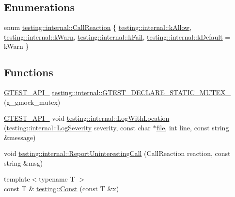 \subsection*{Enumerations}
\begin{DoxyCompactItemize}
\item 
enum \hyperlink{namespacetesting_1_1internal_adfcd859062983a889f4bd18e6977357e}{testing\+::internal\+::\+Call\+Reaction} \{ \hyperlink{namespacetesting_1_1internal_adfcd859062983a889f4bd18e6977357ea8fb8a836a31364701cd5c07daa8638cb}{testing\+::internal\+::k\+Allow}, 
\hyperlink{namespacetesting_1_1internal_adfcd859062983a889f4bd18e6977357ead61a9c681c751967e19f7abe4640d4a2}{testing\+::internal\+::k\+Warn}, 
\hyperlink{namespacetesting_1_1internal_adfcd859062983a889f4bd18e6977357ea6fc25174a501f31b090a2b556f77fdc1}{testing\+::internal\+::k\+Fail}, 
\hyperlink{namespacetesting_1_1internal_adfcd859062983a889f4bd18e6977357ea8ff660434ddb710d1d588df98ee902fc}{testing\+::internal\+::k\+Default} = k\+Warn
 \}
\end{DoxyCompactItemize}
\subsection*{Functions}
\begin{DoxyCompactItemize}
\item 
\hyperlink{gtest-port_8h_aa73be6f0ba4a7456180a94904ce17790}{G\+T\+E\+S\+T\+\_\+\+A\+P\+I\+\_\+} \hyperlink{namespacetesting_1_1internal_ae4d273e9b76b40a28483826518e68f17}{testing\+::internal\+::\+G\+T\+E\+S\+T\+\_\+\+D\+E\+C\+L\+A\+R\+E\+\_\+\+S\+T\+A\+T\+I\+C\+\_\+\+M\+U\+T\+E\+X\+\_\+} (g\+\_\+gmock\+\_\+mutex)
\item 
\hyperlink{gtest-port_8h_aa73be6f0ba4a7456180a94904ce17790}{G\+T\+E\+S\+T\+\_\+\+A\+P\+I\+\_\+} void \hyperlink{namespacetesting_1_1internal_af271cd1fc0b62a7f4736cb3109e86a37}{testing\+::internal\+::\+Log\+With\+Location} (\hyperlink{namespacetesting_1_1internal_a203d1a8a2147a53d12bbdae40d443914}{testing\+::internal\+::\+Log\+Severity} severity, const char $\ast$\hyperlink{_07copy_08_2_read_camera_model_8m_a151631b2fd2bb776ef06c9f440a7ed74}{file}, int line, const string \&message)
\item 
void \hyperlink{namespacetesting_1_1internal_a8d99a1e87d0cea563b2bfad8a4e65276}{testing\+::internal\+::\+Report\+Uninteresting\+Call} (Call\+Reaction reaction, const string \&msg)
\item 
{\footnotesize template$<$typename T $>$ }\\const T \& \hyperlink{namespacetesting_a945ac56c5508a3c9c032bbe8aae8dcfa}{testing\+::\+Const} (const T \&x)
\end{DoxyCompactItemize}
